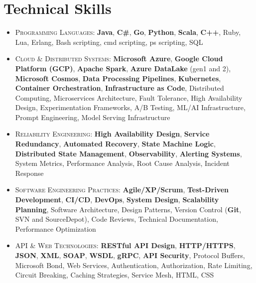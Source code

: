 
\section{Technical Skills}

\begin{itemize}
    \item \footnotesize{\textsc{Programming Languages}:}\scriptsize{ \textbf{Java}, \textbf{C\#}, \textbf{Go}, \textbf{Python}, \textbf{Scala}, \textbf{C++}, Ruby, Lua, Erlang, Bash scripting, cmd scripting, ps scripting, SQL}

    \item \footnotesize{\textsc{Cloud \& Distributed Systems}:}\scriptsize{ \textbf{Microsoft Azure}, \textbf{Google Cloud Platform (GCP)}, \textbf{Apache Spark}, \textbf{Azure DataLake} (gen1 and 2), \textbf{Microsoft Cosmos}, \textbf{Data Processing Pipelines}, \textbf{Kubernetes}, \textbf{Container Orchestration}, \textbf{Infrastructure as Code}, Distributed Computing, Microservices Architecture, Fault Tolerance, High Availability Design, Experimentation Frameworks, A/B Testing, ML/AI Infrastructure, Prompt Engineering, Model Serving Infrastructure}
    
    \item \footnotesize{\textsc{Reliability Engineering}:}\scriptsize{ \textbf{High Availability Design}, \textbf{Service Redundancy}, \textbf{Automated Recovery}, \textbf{State Machine Logic}, \textbf{Distributed State Management}, \textbf{Observability}, \textbf{Alerting Systems}, System Metrics, Performance Analysis, Root Cause Analysis, Incident Response}
    
    \item \footnotesize{\textsc{Software Engineering Practices}:}\scriptsize{ \textbf{Agile/XP/Scrum}, \textbf{Test-Driven Development}, \textbf{CI/CD}, \textbf{DevOps}, \textbf{System Design}, \textbf{Scalability Planning}, Software Architecture, Design Patterns, Version Control (\textbf{Git}, SVN and SourceDepot), Code Reviews, Technical Documentation, Performance Optimization}
    
    \item \footnotesize{\textsc{API \& Web Technologies}:}\scriptsize{ \textbf{RESTful API Design}, \textbf{HTTP/HTTPS}, \textbf{JSON}, \textbf{XML}, \textbf{SOAP}, \textbf{WSDL}, \textbf{gRPC}, \textbf{API Security}, Protocol Buffers, Microsoft Bond, Web Services, Authentication, Authorization, Rate Limiting, Circuit Breaking, Caching Strategies, Service Mesh, HTML, CSS}
    

\end{itemize}
